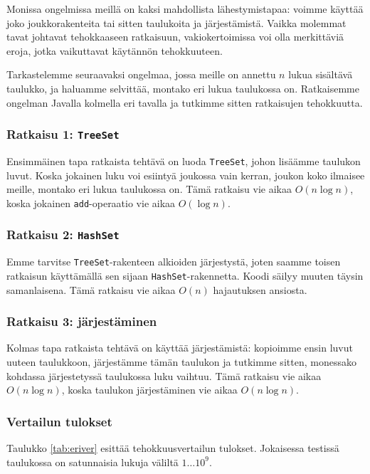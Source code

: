 Monissa ongelmissa meillä on kaksi mahdollista lähestymistapaa:
voimme käyttää joko joukkorakenteita tai sitten taulukoita ja järjestämistä.
Vaikka molemmat tavat johtavat tehokkaaseen ratkaisuun,
vakiokertoimissa voi olla merkittäviä eroja, jotka vaikuttavat
käytännön tehokkuuteen.

Tarkastelemme seuraavaksi ongelmaa, jossa meille on annettu
$n$ lukua sisältävä taulukko, ja haluamme selvittää,
montako eri lukua taulukossa on.
Ratkaisemme ongelman Javalla kolmella eri tavalla ja tutkimme sitten
ratkaisujen tehokkuutta.

\subsubsection{Ratkaisu 1: \texttt{TreeSet}}

Ensimmäinen tapa ratkaista tehtävä on luoda \texttt{TreeSet},
johon lisäämme taulukon luvut.
Koska jokainen luku voi esiintyä joukossa vain kerran,
joukon koko ilmaisee meille, montako eri lukua taulukossa on.
Tämä ratkaisu vie aikaa $O(n \log n)$, koska jokainen
\texttt{add}-operaatio vie aikaa $O(\log n)$.

\subsubsection{Ratkaisu 2: \texttt{HashSet}}

Emme tarvitse \texttt{TreeSet}-rakenteen
alkioiden järjestystä, joten saamme toisen ratkaisun
käyttämällä sen sijaan \texttt{HashSet}-rakennetta.
Koodi säilyy muuten täysin samanlaisena.
Tämä ratkaisu vie aikaa $O(n)$ hajautuksen ansiosta.

\subsubsection{Ratkaisu 3: järjestäminen}

Kolmas tapa ratkaista tehtävä on käyttää järjestämistä:
kopioimme ensin luvut uuteen taulukkoon, järjestämme tämän taulukon ja
tutkimme sitten, monessako kohdassa järjestetyssä taulukossa luku vaihtuu.
Tämä ratkaisu vie aikaa $O(n \log n)$, koska taulukon järjestäminen
vie aikaa $O(n \log n)$.

\subsubsection{Vertailun tulokset}

Taulukko \ref{tab:eriver} esittää tehokkuusvertailun tulokset.
Jokaisessa testissä taulukossa on satunnaisia lukuja väliltä $1 \dots 10^9$.


